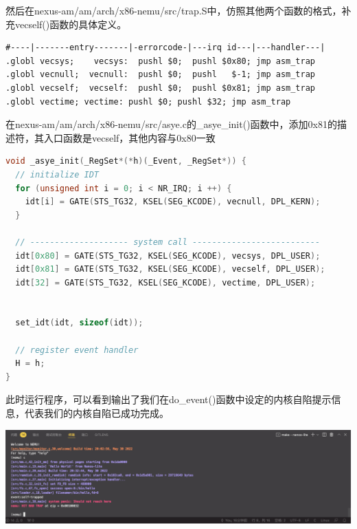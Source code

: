 \documentclass[UTF8,a4paper,10pt]{ctexart}
\begin{document}
然后在nexus-am/am/arch/x86-nemu/src/trap.S中，仿照其他两个函数的格式，补充vecself()函数的具体定义。
\begin{lstlisting}[]
#----|-------entry-------|-errorcode-|---irq id---|---handler---|
.globl vecsys;    vecsys:  pushl $0;  pushl $0x80; jmp asm_trap
.globl vecnull;  vecnull:  pushl $0;  pushl   $-1; jmp asm_trap
.globl vecself;  vecself:  pushl $0;  pushl $0x81; jmp asm_trap 
.globl vectime; vectime: pushl $0; pushl $32; jmp asm_trap 
\end{lstlisting}
在nexus-am/am/arch/x86-nemu/src/asye.c的\_asye\_init()函数中，添加0x81的描述符，其入口函数是vecself，其他内容与0x80一致
\begin{lstlisting}[language = C++]
void _asye_init(_RegSet*(*h)(_Event, _RegSet*)) {
  // initialize IDT
  for (unsigned int i = 0; i < NR_IRQ; i ++) {
    idt[i] = GATE(STS_TG32, KSEL(SEG_KCODE), vecnull, DPL_KERN);
  }

  // -------------------- system call --------------------------
  idt[0x80] = GATE(STS_TG32, KSEL(SEG_KCODE), vecsys, DPL_USER);
  idt[0x81] = GATE(STS_TG32, KSEL(SEG_KCODE), vecself, DPL_USER);
  idt[32] = GATE(STS_TG32, KSEL(SEG_KCODE), vectime, DPL_USER);


  set_idt(idt, sizeof(idt));

  // register event handler
  H = h;
}
\end{lstlisting}
此时运行程序，可以看到输出了我们在do\_event()函数中设定的内核自陷提示信息，代表我们的内核自陷已成功完成。
\begin{center}
  \includegraphics[scale = 0.53]{./img/9.png}
\end{center}
\end{document}
